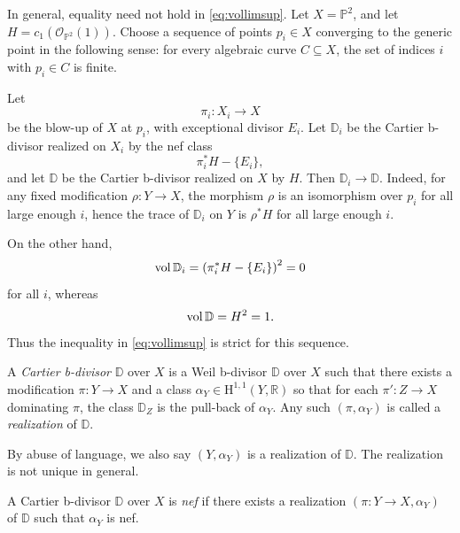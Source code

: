 \begin{example}\label{ex:volbdivnetstrict}
    In general, equality need not hold in \eqref{eq:vollimsup}. Let $X=\mathbb{P}^2$, and let $H=c_1(\mathcal{O}_{\mathbb{P}^2}(1))$. Choose a sequence of points
    $p_i\in X$ converging to the generic point in the following sense: for every algebraic curve $C\subseteq X$, the set of indices $i$ with $p_i\in C$ is finite.

    Let
    \[
        \pi_i\colon X_i\rightarrow X
    \]
    be the blow-up of $X$ at $p_i$, with exceptional divisor $E_i$. Let $\mathbb{D}_i$ be the Cartier b-divisor realized on $X_i$ by the nef class
    \[
        \pi_i^*H-\{E_i\},
    \]
    and let $\mathbb{D}$ be the Cartier b-divisor realized on $X$ by $H$. Then $\mathbb{D}_i\to \mathbb{D}$.
    Indeed, for any fixed modification $\rho\colon Y\rightarrow X$, the morphism $\rho$ is an isomorphism over $p_i$ for all large enough $i$, hence the trace of $\mathbb{D}_i$ on $Y$ is $\rho^*H$ for all large enough $i$.

    On the other hand,
    \[
        \operatorname{vol} \mathbb{D}_i=\left(\pi_i^*H-\{E_i\}\right)^2=0
    \]
    for all $i$, whereas
    \[
        \operatorname{vol} \mathbb{D}=H^2=1.
    \]
    Thus the inequality in \eqref{eq:vollimsup} is strict for this sequence.
\end{example}

\begin{definition}\label{def:bdiv:L116}
    A \emph{Cartier b-divisor} $\mathbb{D}$ over $X$ is a Weil b-divisor $\mathbb{D}$ over $X$ such that there exists a modification $\pi\colon Y\rightarrow X$ and a class $\alpha_Y\in \mathrm{H}^{1,1}(Y,\mathbb{R})$ so that for each $\pi'\colon Z\rightarrow X$ dominating $\pi$, the class $\mathbb{D}_Z$ is the pull-back of $\alpha_Y$. Any such $(\pi,\alpha_Y)$ is called a \emph{realization} of $\mathbb{D}$.
\end{definition}
By abuse of language, we also say $(Y,\alpha_Y)$ is a realization of $\mathbb{D}$.
The realization is not unique in general.


\begin{definition}\label{def:nefCar}
    A Cartier b-divisor $\mathbb{D}$ over $X$ is \emph{nef} if there exists a realization $(\pi\colon Y\rightarrow X, \alpha_Y)$ of $\mathbb{D}$ such that $\alpha_Y$ is nef.
\end{definition}

